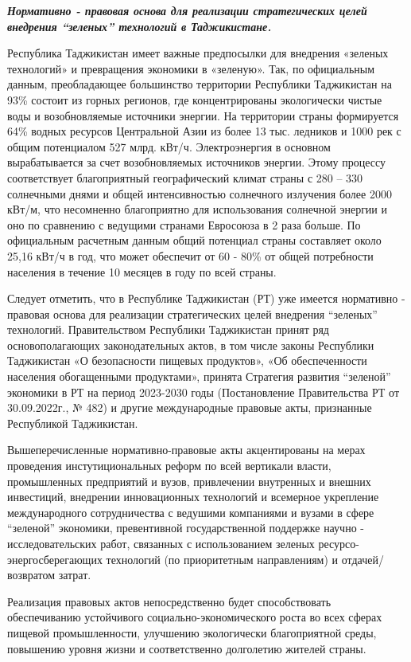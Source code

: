 \emph{{\bfseries Нормативно - правовая основа для реализации стратегических
целей внедрения ``зеленых'' технологий в Таджикистане.}}

Республика Таджикистан имеет важные предпосылки для внедрения «зеленых
технологий» и превращения экономики в «зеленую». Так, по официальным
данным, преобладающее большинство территории Республики Таджикистан на
93\% состоит из горных регионов, где концентрированы экологически чистые
воды и возобновляемые источники энергии. На территории страны
формируется 64\% водных ресурсов Центральной Азии из более 13 тыс.
ледников и 1000 рек с общим потенциалом 527 млрд. кВт/ч. Электроэнергия
в основном вырабатывается за счет возобновляемых источников энергии.
Этому процессу соответствует благоприятный географический климат страны
с 280 -- 330 солнечными днями и общей интенсивностью солнечного
излучения более 2000 кВт/м, что несомненно благоприятно для
использования солнечной энергии и оно по сравнению с ведущими странами
Евросоюза в 2 раза больше. По официальным расчетным данным общий
потенциал страны составляет около 25,16 кВт/ч в год, что может обеспечит
от 60 - 80\% от общей потребности населения в течение 10 месяцев в году
по всей страны.

Следует отметить, что в Республике Таджикистан (РТ) уже имеется
нормативно - правовая основа для реализации стратегических целей
внедрения ``зеленых'' технологий. Правительством Республики Таджикистан
принят ряд основополагающих законодательных актов, в том числе законы
Республики Таджикистан «О безопасности пищевых продуктов», «Об
обеспеченности населения обогащенными продуктами», принята Стратегия
развития ``зеленой'' экономики в РТ на период 2023-2030 годы
(Постановление Правительства РТ от 30.09.2022г., № 482) и другие
международные правовые акты, признанные Республикой Таджикистан.

Вышеперечисленные нормативно-правовые акты акцентированы на мерах
проведения инстутициональных реформ по всей вертикали власти,
промышленных предприятий и вузов, привлечении внутренных и внешних
инвестиций, внедрении инновационных технологий и всемерное укрепление
международного сотрудничества с ведушими компаниями и вузами в сфере
``зеленой'' экономики, превентивной государственной поддержке научно -
исследовательских работ, связанных с использованием зеленых
ресурсо-энергосберегающих технологий (по приоритетным направлениям) и
отдачей/возвратом затрат.

Реализация правовых актов непосредственно будет способствовать
обеспечиванию устойчивого социально-экономического роста во всех сферах
пищевой промышленности, улучшению экологически благоприятной среды,
повышению уровня жизни и соответственно долголетию жителей страны.


